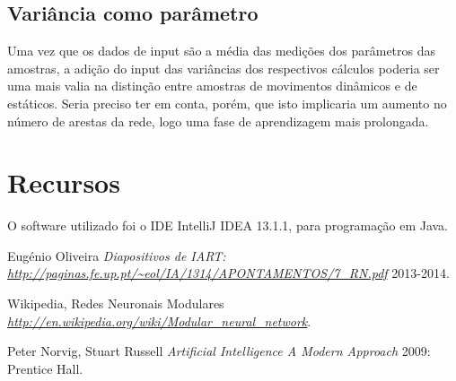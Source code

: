 \documentclass[10pt,a4paper]{article}
\begin{document}
\subsection{Variância como parâmetro}
Uma vez que os dados de input são a média das medições dos parâmetros das amostras, a adição do input das variâncias dos respectivos cálculos poderia ser uma mais valia na distinção entre amostras de movimentos dinâmicos e de estáticos. Seria preciso ter em conta, porém, que isto implicaria um aumento no número de arestas da rede, logo uma fase de aprendizagem mais prolongada.

\section{Recursos}

O software utilizado foi o IDE IntelliJ IDEA 13.1.1, para programação em Java.


 \begin{thebibliography}{1}

   Eugénio Oliveira {\em Diapositivos de IART: {\url{http://paginas.fe.up.pt/~eol/IA/1314/APONTAMENTOS/7_RN.pdf}}}  2013-2014.
  
   Wikipedia, Redes Neuronais Modulares {\em\url{http://en.wikipedia.org/wiki/Modular_neural_network}}.

   Peter Norvig, Stuart Russell {\em Artificial Intelligence A Modern Approach } 2009: Prentice Hall.
  \end{thebibliography}
  \printindex
\end{document}

